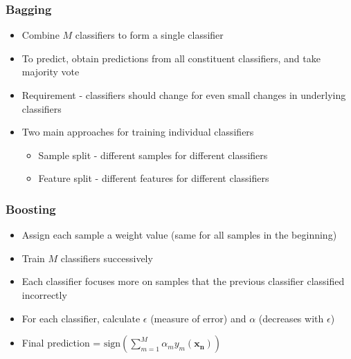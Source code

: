 \documentclass[9pt]{beamer}
\begin{document}
    \begin{frame}
        \frametitle{Bagging}
        \begin{itemize}
            \item{Combine $M$ classifiers to form a single classifier}
            \item{To predict, obtain predictions from all constituent classifiers, and take majority vote}
            \item{Requirement - classifiers should change for even small changes in underlying classifiers}
            \item{
            Two main approaches for training individual classifiers
            \begin{itemize}
                \item{Sample split - different samples for different classifiers}
                \item{Feature split - different features for different classifiers}
            \end{itemize}
            }
        \end{itemize}
    \end{frame}
    
    \begin{frame}
        \frametitle{Boosting}
        \begin{itemize}
            \item{Assign each sample a weight value (same for all samples in the beginning)}
            \item{Train $M$ classifiers successively}
            \item{Each classifier focuses more on samples that the previous classifier classified incorrectly}
            \item{For each classifier, calculate $\epsilon$ (measure of error) and $\alpha$ (decreases with $\epsilon$)}
            \item{Final prediction = $\mathrm{sign}(\displaystyle \sum_{m = 1}^{M} \alpha_m y_m(\mathbf{x_n}))$}
        \end{itemize}
    \end{frame}
    
\end{document}
